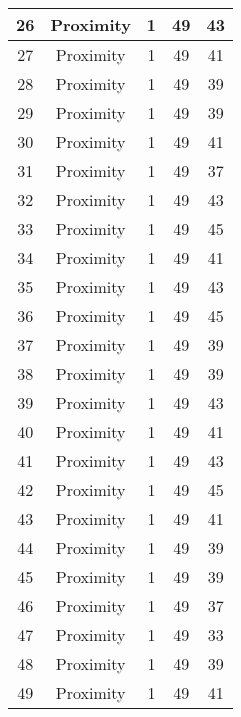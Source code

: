 \documentclass[results.tex]{subfiles}
\begin{document}
\begin{center}
\begin{tabular}{| c || c | c | c | c |}
    \hline
    26 & Proximity & 1 & 49 & 43 \\ 
    \hline
    27 & Proximity & 1 & 49 & 41 \\ 
    \hline
    28 & Proximity & 1 & 49 & 39 \\ 
    \hline
    29 & Proximity & 1 & 49 & 39 \\ 
    \hline
    30 & Proximity & 1 & 49 & 41 \\ 
    \hline
    31 & Proximity & 1 & 49 & 37 \\ 
    \hline
    32 & Proximity & 1 & 49 & 43 \\ 
    \hline
    33 & Proximity & 1 & 49 & 45 \\ 
    \hline
    34 & Proximity & 1 & 49 & 41 \\ 
    \hline
    35 & Proximity & 1 & 49 & 43 \\ 
    \hline
    36 & Proximity & 1 & 49 & 45 \\ 
    \hline
    37 & Proximity & 1 & 49 & 39 \\ 
    \hline
    38 & Proximity & 1 & 49 & 39 \\ 
    \hline
    39 & Proximity & 1 & 49 & 43 \\ 
    \hline
    40 & Proximity & 1 & 49 & 41 \\ 
    \hline
    41 & Proximity & 1 & 49 & 43 \\ 
    \hline
    42 & Proximity & 1 & 49 & 45 \\ 
    \hline
    43 & Proximity & 1 & 49 & 41 \\ 
    \hline
    44 & Proximity & 1 & 49 & 39 \\ 
    \hline
    45 & Proximity & 1 & 49 & 39 \\ 
    \hline
    46 & Proximity & 1 & 49 & 37 \\ 
    \hline
    47 & Proximity & 1 & 49 & 33 \\ 
    \hline
    48 & Proximity & 1 & 49 & 39 \\ 
    \hline
    49 & Proximity & 1 & 49 & 41 \\ 
    \hline   \end{tabular}
\end{center}
\end{document}
